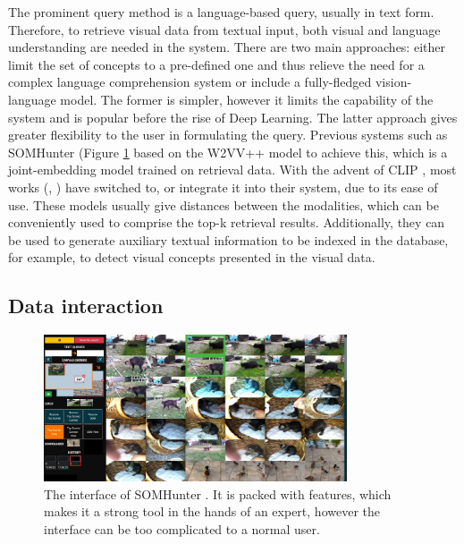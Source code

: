 The prominent query method is a language-based query, usually in text form. Therefore, to retrieve visual data from textual input, both visual and language understanding are needed in the system. There are two main approaches: either limit the set of concepts to a pre-defined one and thus relieve the need for a complex language comprehension system or include a fully-fledged vision-language model. The former is simpler, however it limits the capability of the system and is popular before the rise of Deep Learning. The latter approach gives greater flexibility to the user in formulating the query. Previous systems such as SOMHunter \cite{lokoc_enhanced_2021} (Figure \ref{fig:SOMHunter} based on the W2VV++ \cite{li_w2vv_2019} model to achieve this, which is a joint-embedding model trained on retrieval data. With the advent of CLIP \cite{radford_learning_2021}, most works (\cite{alam_memento_2022}, \cite{nguyen_lifeseeker_2022}) have switched to, or integrate it into their system, due to its ease of use. These models usually give distances between the modalities, which can be conveniently used to comprise the top-k retrieval results. Additionally, they can be used to generate auxiliary textual information to be indexed in the database, for example, to detect visual concepts presented in the visual data.

\subsection{Data interaction}

\begin{figure}
    \centering
    \includegraphics[width=0.8\textwidth]{content/resources/images/SOMHunter21.png}
    \caption{The interface of SOMHunter \cite{lokoc_enhanced_2021}. It is packed with features, which makes it a strong tool in the hands of an expert, however the interface can be too complicated to a normal user. }
    \label{fig:SOMHunter}
\end{figure}

